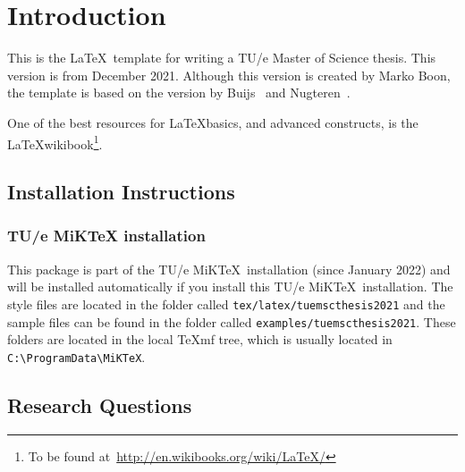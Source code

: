 \chapter{Introduction}\label{chapter:introduction}

This is the \LaTeX\ template for writing a TU/e Master of Science thesis. This version is from December 2021. Although this version is created by Marko Boon, the template is based on the version by Buijs~\cite{MScBuijs2010} and Nugteren~\cite{MScNugteren2010}.

One of the best resources for \LaTeX basics, and advanced constructs, is the \LaTeX wikibook\footnote{To be found at~\url{http://en.wikibooks.org/wiki/LaTeX/}}. 

\section{Installation Instructions}

\subsection{TU/e MiKTeX installation}

This package is part of the TU/e MiK\TeX\ installation (since January 2022) and will be installed automatically if you install this TU/e MiK\TeX\ installation. The style files are located in the folder called \verb|tex/latex/tuemscthesis2021| and the sample files can be found in the folder called \verb|examples/tuemscthesis2021|. These folders are located in the local \TeX mf tree, which is usually located in \verb|C:\ProgramData\MiKTeX|.

\section{Research Questions}



